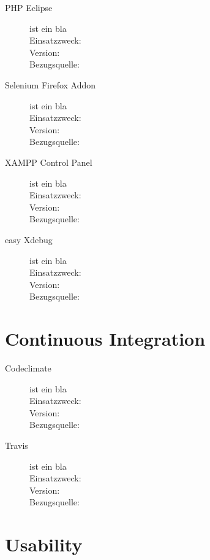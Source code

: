 \documentclass[12pt, a4paper]{report}
\begin{document}
	\begin{description}
		\item [PHP Eclipse] ist ein bla \\
		Einsatzzweck: \\
		Version: \\
		Bezugsquelle: \\
		
		
		\item [Selenium Firefox Addon] ist ein bla \\
		Einsatzzweck: \\
		Version: \\
		Bezugsquelle: \\
	
	
		\item [XAMPP Control Panel] ist ein bla \\
		Einsatzzweck: \\
		Version: \\
		Bezugsquelle: \\
		
		
		\item [easy Xdebug] ist ein bla \\
		Einsatzzweck: \\
		Version: \\
		Bezugsquelle: \\
	\end{description}
	
	
	
	\section{Continuous Integration}
	
	\begin{description}
		\item [Codeclimate] ist ein bla \\
		Einsatzzweck: \\
		Version: \\
		Bezugsquelle: \\
		
		
		\item [Travis] ist ein bla \\
		Einsatzzweck: \\
		Version: \\
		Bezugsquelle: \\
	\end{description}
	
	
	
	\section{Usability}
	
\end{document}
